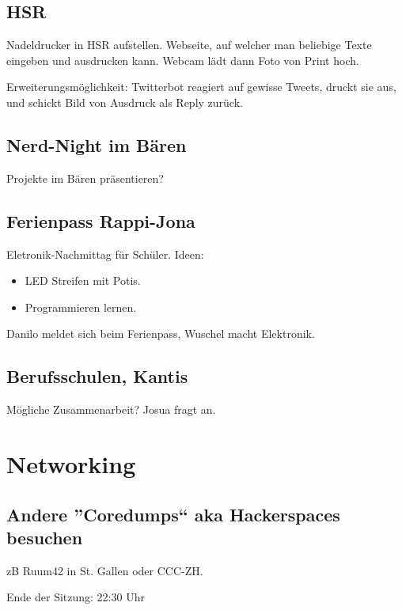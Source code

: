 \documentclass[10pt,a4paper,parskip,fleqn]{scrartcl}
\newcommand{\ul}{\begin{itemize}[itemsep=-0.3em,topsep=-0.3em]}
\newcommand{\lu}{\end{itemize}}
\newcommand{\li}{\item}
\begin{document}
\subsection{HSR}

Nadeldrucker in HSR aufstellen. Webseite, auf welcher man beliebige Texte
eingeben und ausdrucken kann. Webcam lädt dann Foto von Print hoch.

Erweiterungsmöglichkeit: Twitterbot reagiert auf gewisse Tweets, druckt sie aus,
und schickt Bild von Ausdruck als Reply zurück.

\subsection{Nerd-Night im Bären}

Projekte im Bären präsentieren?

\subsection{Ferienpass Rappi-Jona}

Eletronik-Nachmittag für Schüler. Ideen:

\ul
	\li LED Streifen mit Potis.
	\li Programmieren lernen.
\lu

Danilo meldet sich beim Ferienpass, Wuschel macht Elektronik.

\subsection{Berufsschulen, Kantis}

Mögliche Zusammenarbeit? Josua fragt an.

\section{Networking}

\subsection{Andere ''Coredumps`` aka Hackerspaces besuchen}

zB Ruum42 in St. Gallen oder CCC-ZH.


\vspace{1cm}

Ende der Sitzung: 22:30 Uhr
\end{document}
